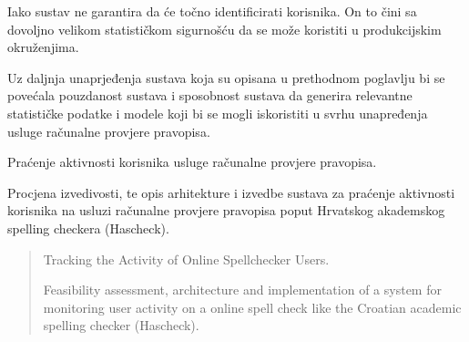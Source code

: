 \documentclass[times, utf8, zavrsni]{fer}
\begin{document}
Iako sustav ne garantira da će točno identificirati korisnika. On to čini sa
dovoljno velikom statističkom sigurnošću da se može koristiti u produkcijskim
okruženjima.

Uz daljnja unaprjeđenja sustava koja su opisana u prethodnom poglavlju bi
se povećala pouzdanost sustava i sposobnost sustava da generira relevantne
statističke podatke i modele koji bi se mogli iskoristiti u svrhu unapređenja
usluge računalne provjere pravopisa.




\begin{sazetak}
Praćenje aktivnosti korisnika usluge računalne provjere pravopisa.

Procjena izvedivosti, te opis arhitekture i izvedbe sustava za praćenje
aktivnosti korisnika na usluzi računalne provjere pravopisa poput Hrvatskog
akademskog spelling checkera (Hascheck).

\end{sazetak}

\begin{abstract}
Tracking the Activity of Online Spellchecker Users.

Feasibility assessment, architecture and implementation of a system for
monitoring user activity on a online spell check like the Croatian
academic spelling checker (Hascheck).

\end{abstract}
\end{document}
